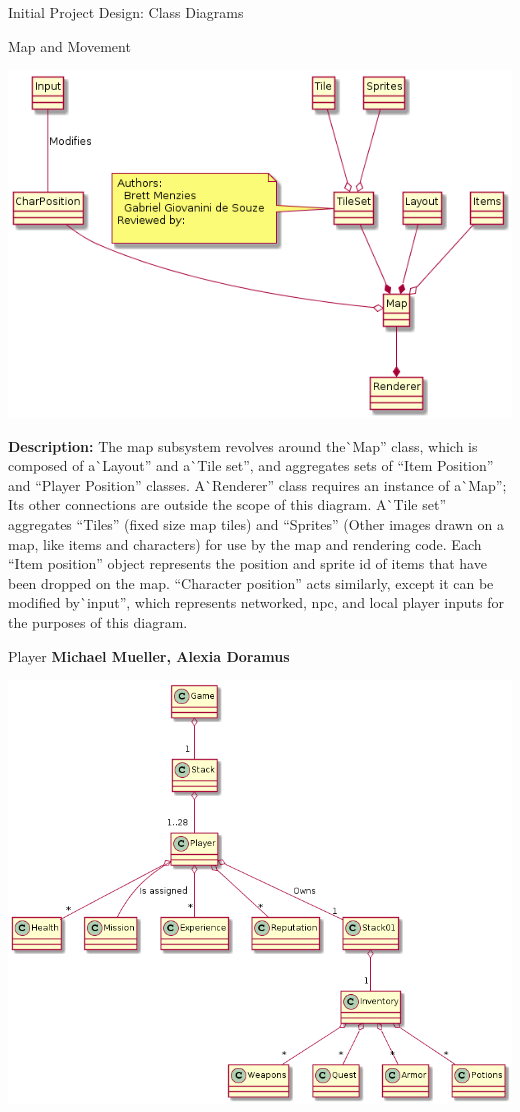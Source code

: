 \documentclass[12pt]{report}
\begin{document}
\begin{chapter}{Initial Project Design: Class Diagrams}
\begin{section}{Map and Movement}
    \centerline{\includegraphics[width=\textwidth,height=\textheight,keepaspectratio]{./images/map_and_movement.png}}
    \textbf{Description:}
    The map subsystem revolves around the\`{ }Map'' class,
    which is composed of a\`{ }Layout'' and a\`{ }Tile set'',
    and aggregates sets of ``Item Position'' and ``Player Position'' classes.
    A\`{ }Renderer'' class requires an instance of a\`{ }Map'';
    Its other connections are outside the scope of this diagram.
    A\`{ }Tile set'' aggregates ``Tiles'' (fixed size map tiles) and 
    ``Sprites'' (Other images drawn on a map, like items and characters) for use by the map and rendering code.
    Each ``Item position'' object represents the position and sprite id of items that have been dropped on the map.
    ``Character position'' acts similarly, except it can be modified by\`{ }input'', which represents 
    networked, npc, and local player inputs for the purposes of this diagram.
  \end{section}
 
  \begin{section}{Player}
     \textbf{Michael Mueller, Alexia Doramus}\\

     \centerline{\includegraphics[width=\textwidth]{./images/playerclass.png}}


\end{section}
\end{chapter}
\end{document}
